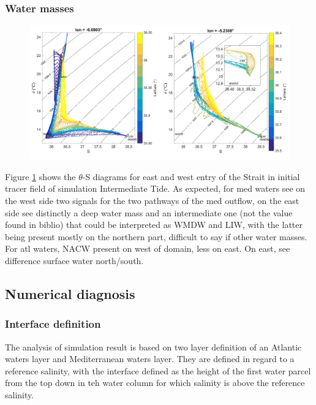 \subsubsection{Water masses}


\begin{figure}[!h]
        \includegraphics[width=\textwidth]{./GBR3D/WM_ini_IES.png}
        \label{Fig_Ini_WM3D}
\end{figure}


Figure \ref{Fig_Ini_WM3D} shows the $\theta$-S diagrams for east and west entry of the Strait in initial tracer field of simulation Intermediate Tide. As expected, for med waters see on the west side two signals for the two pathways of the med outflow, on the east side see distinctly a deep water mass and an intermediate one (not the value found in biblio) that could be interpreted as WMDW and LIW, with the latter being present mostly on the northern part, difficult to say if other water masses. For atl waters, NACW present on west of domain, less on east. On east, see difference surface water north/south.




\subsection{Numerical diagnosis}


\subsubsection{Interface definition}

The analysis of simulation result is based on two layer definition of an Atlantic waters layer and Mediterranean waters layer. They are defined in regard to a reference salinity, with the interface defined as the height of the first water parcel from the top down in teh water column for which salinity is above the reference salinity.

